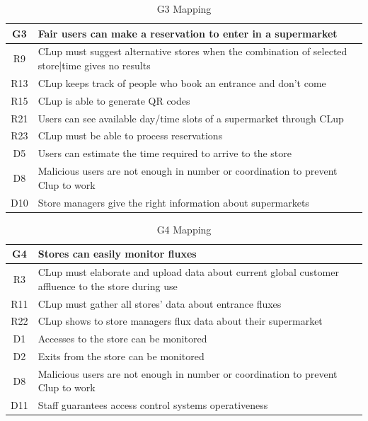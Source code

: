 \begin{table}[H]
	\begin{tabular}{c|l}
		\cellcolor{lightgray}\textbf{G3} & \textbf{Fair users can make a reservation to enter in a supermarket}\\
		\hline
		\cellcolor{YellowGreen} R9 & CLup must suggest alternative stores when the combination of selected store|time gives no results\\
		\hline
		\cellcolor{YellowGreen} R13 & CLup keeps track of people who book an entrance and don’t come\\
		\hline
		\cellcolor{YellowGreen} R15 & CLup is able to generate QR codes \\
		\hline
		\cellcolor{YellowGreen} R21 & Users can see available day/time slots of a supermarket through CLup\\
		\hline
		\cellcolor{YellowGreen} R23 & CLup must be able to process reservations\\
		\hline
		\cellcolor{YellowOrange} D5 & Users can estimate the time required to arrive to the store\\
		\hline
		\cellcolor{YellowOrange} D8 & Malicious users are not enough in number or coordination to prevent Clup to work\\
		\hline
		\cellcolor{YellowOrange} D10 & Store managers give the right information about supermarkets\\
	\end{tabular}
	\label{tab:G3Mapping}
	\caption{G3 Mapping}
\end{table}

\begin{table}[H]
	\begin{tabular}{c|l}
		\cellcolor{lightgray}\textbf{G4} & \textbf{Stores can easily monitor fluxes}\\
		\hline
		\cellcolor{YellowGreen} R3 & CLup must elaborate and upload data about current global customer affluence to the store during use\\
		\hline
		\cellcolor{YellowGreen} R11 & CLup must gather all stores' data about entrance fluxes\\
		\hline
		\cellcolor{YellowGreen} R22 & CLup shows to store managers flux data about their supermarket \\
		\hline
		\cellcolor{YellowOrange} D1 & Accesses to the store can be monitored\\
		\hline
		\cellcolor{YellowOrange} D2 & Exits from the store can be monitored\\
		\hline
		\cellcolor{YellowOrange} D8 & Malicious users are not enough in number or coordination to prevent Clup to work\\
		\hline
		\cellcolor{YellowOrange} D11 & Staff guarantees access control systems operativeness\\
	\end{tabular}
	\label{tab:G4Mapping}
	\caption{G4 Mapping}
\end{table}

